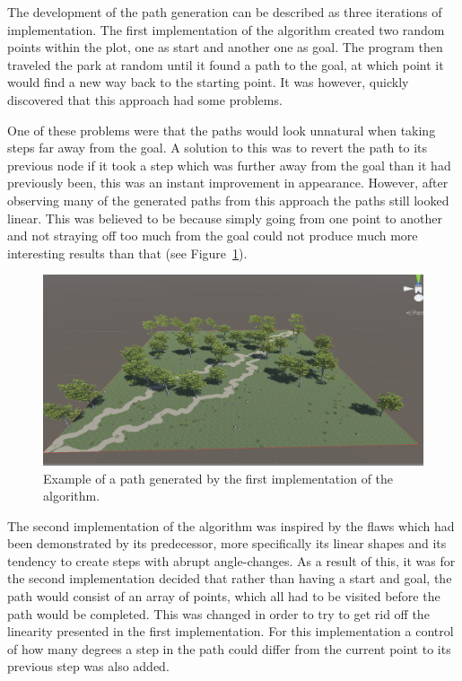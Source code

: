 The development of the path generation can be described as three iterations of implementation.
The first implementation of the algorithm created two random points within the plot, one as start and another one as goal. 
The program then traveled the park at random until it found a path to the goal, at which point it would find a new way back to the starting point. 
It was however, quickly discovered that this approach had some problems.
 
One of these problems were that the paths would look unnatural when taking steps far away from the goal. 
A solution to this was to revert the path to its previous node if it took a step which was further away from the goal than it had previously been, this was an instant improvement in appearance. 
However, after observing many of the generated paths from this approach the paths still looked linear. 
This was believed to be because simply going from one point to another and not straying off too much from the goal could not produce much more interesting results than that (see Figure~\ref{fig:linear}).
\begin{figure}[H]
\includegraphics[width=\linewidth]{figure/linear.png}
\caption{Example of a path generated by the first implementation of the algorithm.}
\label{fig:linear}
\end{figure}
The second implementation of the algorithm was inspired by the flaws which had been demonstrated by its predecessor, more specifically its linear shapes and its tendency to create steps with abrupt angle-changes.
As a result of this, it was for the second implementation decided that rather than having a start and goal, the path would consist of an array of points, which all had to be visited before the path would be completed.
This was changed in order to try to get rid off the linearity presented in the first implementation.
For this implementation a control of how many degrees a step in the path could differ from the current point to its previous step was also added.
